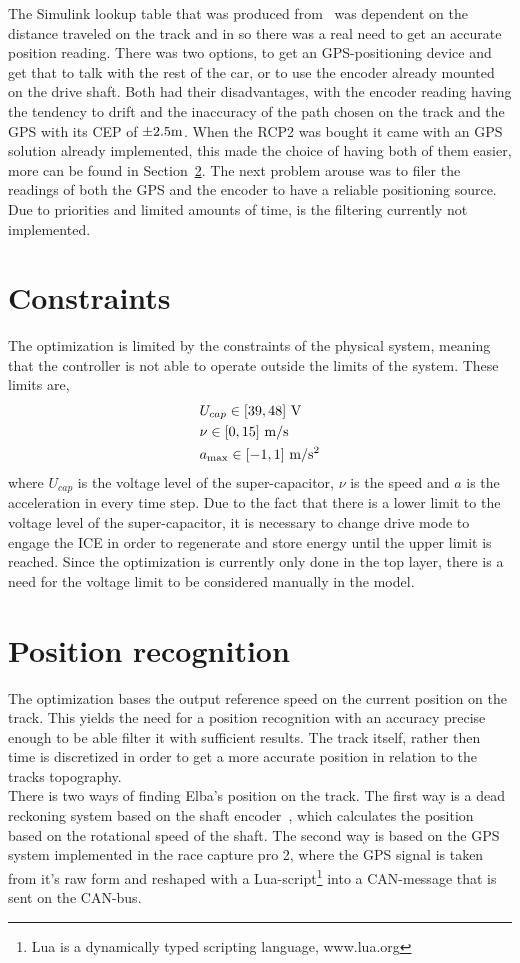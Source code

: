 The Simulink lookup table that was produced from~\cite{liu2016} was dependent on
the distance traveled on the track and in so there was a real need to get an
accurate position reading. There was two options, to get an GPS-positioning
device and get that to talk with the rest of the car, or to use the encoder
already mounted on the drive shaft. Both had their disadvantages, with the
encoder reading having the tendency to drift and the inaccuracy of the path
chosen on the track and the GPS with its CEP of $\pm2.5\textnormal{m}$. When the
RCP2 was bought it came with an GPS solution already implemented, this made the
choice of having both of them easier, more can be found in
Section~\ref{sec:opt_pos_recon}. The next problem arouse was to filer the
readings of both the GPS and the encoder to have a reliable positioning source.
Due to priorities and limited amounts of time, is the filtering currently not
implemented. 

\section{Constraints}
The optimization is limited by the constraints of the physical system, meaning that
the controller is not able to operate outside the limits of the system. These limits
are,
\begin{align}
    &U_{cap} \in [39,48]~\textup{V} \\
    &\nu \in [0,15]~\textup{m/s}\\
    &a_{\max} \in [-1,1]~\textup{m/s$^2$}
\end{align}
where $U_{cap}$ is the voltage level of the super-capacitor, $\nu$ is the speed
and $a$ is the acceleration in every time step. Due to the fact that there is a
lower limit to the voltage level of the super-capacitor, it is necessary to
change drive mode to engage the ICE in order to regenerate and store energy
until the upper limit is reached. Since the optimization is currently only done
in the top layer, there is a need for the voltage limit to be considered
manually in the model.

\section{Position recognition}\label{sec:opt_pos_recon}
The optimization bases the output reference speed on the current position on the
track. This yields the need for a position recognition with an accuracy precise
enough to be able filter it with sufficient results. The track itself, rather
then time is discretized in order to get a more accurate position in relation to
the tracks topography. \\
There is two ways of finding Elba's position on the track. The first way is a dead
reckoning system based on the shaft encoder~\cite[p.~49]{elba2015},
which calculates the position based on the rotational speed of the shaft. The
second way is based on the GPS system implemented in the race capture pro 2,
where the GPS signal is taken from it's raw form and reshaped with a
Lua-script\footnote{Lua is a dynamically typed scripting language, www.lua.org}
into a CAN-message that is sent on the CAN-bus.


